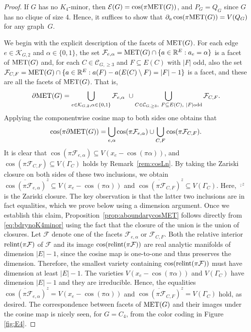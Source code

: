\documentclass[a4paper, 11pt, twoside]{article}
\newcommand{\R}{\mathbb{R}}
\newcommand{\ME}{{\mathcal E}}
\newcommand{\MF}{{\mathcal F}}
\newcommand{\MET}{\text{\rm MET}}
\newcommand{\MK}{{\mathcal K}}
\newcommand{\MC}{{\mathcal C}}
\theoremstyle{plain}
\begin{document}
\begin{proof}
If $G$ has no $K_4$-minor, then $\ME(G)=\cos(\pi\MET(G))$, and $P_G=Q_G$ since $G$ has no clique of size 4. Hence, it suffices to show that $\partial_a\cos(\pi\MET(G))=V(Q_G)$ for any graph~$G$.

 We begin with  the explicit  description of the facets of $\MET(G)$. For each edge $e\in \MK_{G,2}$ and $\alpha\in \{0,1\}$, the set $\MF_{e,\alpha}=\MET(G)\cap\{a\in\R^E: a_e=\alpha\}$ is a facet of $\MET(G)$ and, for each $C\in\MC_{G,\ge 3}$ and $F\subseteq E(C)$ with $|F|$ odd, also the set 
 $\MF_{C,F}=\MET(G)\cap\{a\in \R^{E}: a(F)-a(E(C)\setminus F)=|F|-1\}$ is a facet, and these are all the facets of $\MET(G)$. That is,  
\[\partial \MET(G)=\bigcup_{e\in\MK_{G,2},\alpha \in\{0,1\}}\MF_{e,\alpha} \  \cup
 \bigcup_{C\in \MC_{G,\ge 3},\ F\subseteq E(C),\ |F| \text{\rm odd}} \MF_{C,F}.
 \]
Applying the componentwise cosine map to both sides one obtains that 
\begin{equation} \label{eq:bdrynoK4minor} 
\cos (\pi\partial \MET(G))= \bigcup_{e,\alpha}\cos (\pi \MF_{e,\alpha})\cup\bigcup_{C,F}\cos(\pi \MF_{C,F}).
\end{equation}
It is clear that $\cos (\pi \MF_{e,\alpha}) \subseteq V(x_e-\cos(\pi \alpha))$, and $\cos(\pi \MF_{C,F}) \subseteq V(\Gamma_C)$ holds by Remark~\ref{rem:cosLn}. By taking the Zariski closure on both sides of these two inclusions, we obtain
$\overline{\cos (\pi \MF_{e,\alpha})}^z  \subseteq V(x_e-\cos(\pi \alpha))$ and $ \overline{\cos(\pi \MF_{C,F})}^z \subseteq V(\Gamma_C)$. Here, $\overline{\cdot}^z$ is the Zariski closure.
The key observation is that  
the latter two inclusions are in fact equalities, which we prove below using a dimension argument.
Once we establish this claim,   Proposition~\ref{prop:aboundarycosMET}   follows directly from \eqref{eq:bdrynoK4minor} using  the fact that the closure of the union is the union of closures. 
Let $\MF$ denote one of the facets  $\MF_{e,\alpha}$ or $\MF_{C,F}$. 
Both the relative interior ${\rm relint}( \pi \MF )$ of $\MF$ and its   image ${\rm cos}({\rm relint}(\pi \MF)) $ are real analytic manifolds of dimension $|E|-1$, since the cosine map is one-to-one and thus preserves the dimension.
Therefore, the smallest variety containing ${\rm cos}({\rm relint}(\pi \MF))$ must have dimension at least $|E|-1$. The varieties $V(x_e - \cos(\pi \alpha))$ and $V(\Gamma_C)$ have dimension $|E|-1$ and they are irreducible. Hence, the equalities $\overline{\cos (\pi \MF_{e,\alpha})}^z = V(x_e-\cos(\pi \alpha))$ and $ \overline{\cos(\pi \MF_{C,F})}^z =V(\Gamma_C)$ hold, as desired. The correspondence between facets of $\MET(G)$ and their images under the cosine map is nicely seen, for $G = C_4$, from the color coding in Figure \ref{fig:E4}.
\end{proof}
\end{document}
